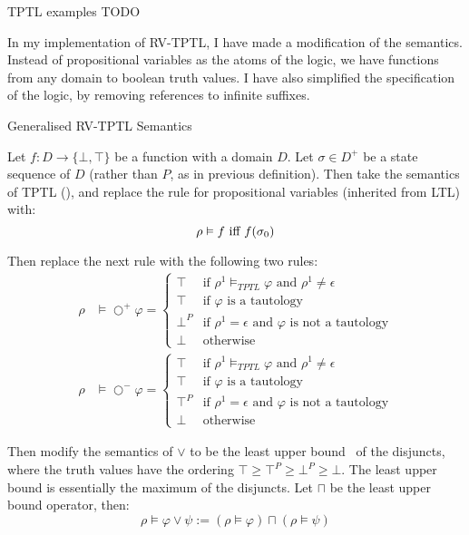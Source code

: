 \documentclass[a4paper]{article}
\newcommand{\tand}{\text{ and }}
\newcommand{\tor}{\text{ or }}
\newcommand{\tiff}{\text{ iff }}
\newcommand{\sn}{\bigcirc^+}
\newcommand{\wn}{\bigcirc^-}
\begin{document}
\begin{eg}{TPTL examples}
  TODO
\end{eg}

In my implementation of RV-TPTL, I have made a modification of the semantics. Instead of propositional variables as the atoms of the logic, we have functions from any domain to boolean truth values. I have also simplified the specification of the logic, by removing references to infinite suffixes.

\begin{defn}{Generalised RV-TPTL Semantics}

  Let $f:D\to\{\bot,\top\}$ be a function with a domain $D$. Let $\sigma\in D^+$ be a state sequence of $D$ (rather than $P$, as in previous definition). Then take the semantics of TPTL (), and replace the rule for propositional variables (inherited from LTL) with:
  \[ \rho \vDash f \tiff f(\sigma_0)\\ \]

  Then replace the next rule with the following two rules:
  \begin{align*}
    \rho&\vDash\sn\varphi =
    \begin{cases}
      \top &\text{if } \rho^1\vDash_{TPTL}\varphi \tand \rho^1 \neq \epsilon\\
      \top &\text{if } \varphi \text{ is a tautology}\\
      \bot^P &\text{if } \rho^1 = \epsilon \tand \varphi \text{ is not a tautology}\\
      \bot &\text{otherwise}
    \end{cases}\\
    \rho&\vDash\wn\varphi =
    \begin{cases}
      \top &\text{if } \rho^1\vDash_{TPTL}\varphi \tand \rho^1 \neq \epsilon\\
      \top &\text{if } \varphi \text{ is a tautology}\\
      \top^P &\text{if } \rho^1 = \epsilon \tand \varphi \text{ is not a tautology}\\
      \bot &\text{otherwise}
    \end{cases}
  \end{align*}

  Then modify the semantics of $\lor$ to be the least upper bound~\autocite[654]{bauer2010comparing} of the disjuncts, where the truth values have the ordering \(\top\geq\top^P\geq\bot^P\geq\bot\). The least upper bound is essentially the maximum of the disjuncts. Let $\sqcap$ be the least upper bound operator, then:
  \[\rho\vDash\varphi\lor\psi := (\rho\vDash\varphi) \sqcap (\rho\vDash\psi)\]

\end{defn}
\end{document}
